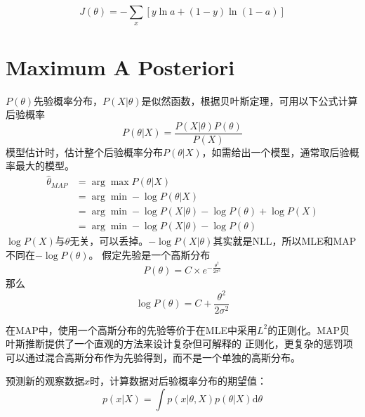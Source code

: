 \[J(\theta) = -\sum_{x}[y\ln a + (1 - y)\ln (1 - a)]\]

\section{Maximum A Posteriori}
$P(\theta)$先验概率分布，$P(X|\theta)$是似然函数，根据贝叶斯定理，可用以下公式计算后验概率
\begin{equation}
    P(\theta|X) = \frac{P(X|\theta)P(\theta)}{P(X)}
\end{equation}
模型估计时，估计整个后验概率分布$P(\theta|X)$，如需给出一个模型，通常取后验概率最大的模型。
\begin{equation}
    \begin{split}
        \hat{\theta}_{MAP} &= \arg \max P(\theta | X) \\
        &= \arg \min -\log P(\theta | X) \\
        &= \arg \min -\log P(X|\theta) - \log P(\theta) + \log P(X) \\
        &= \arg \min -\log P(X|\theta) - \log P(\theta)
    \end{split}
\end{equation}
$\log P(X)$与$\theta$无关，可以丢掉。$-\log P(X|\theta)$其实就是NLL，所以MLE和MAP不同在$- \log P(\theta)$。
假定先验是一个高斯分布
\begin{equation}
    P(\theta) = C \times e^{-\frac{\theta^2}{2\sigma^2}}
\end{equation}
那么
\begin{equation}
    \log P(\theta) = C + \frac{\theta^2}{2\sigma^2}
\end{equation}

在MAP中，使用一个高斯分布的先验等价于在MLE中采用$L^2$的正则化。MAP贝叶斯推断提供了一个直观的方法来设计复杂但可解释的
正则化，更复杂的惩罚项可以通过混合高斯分布作为先验得到，而不是一个单独的高斯分布。


预测新的观察数据$x$时，计算数据对后验概率分布的期望值：
\begin{equation}
    p(x|X) = \int p(x | \theta, X)p(\theta|X)\mathrm{d}\theta
\end{equation}
